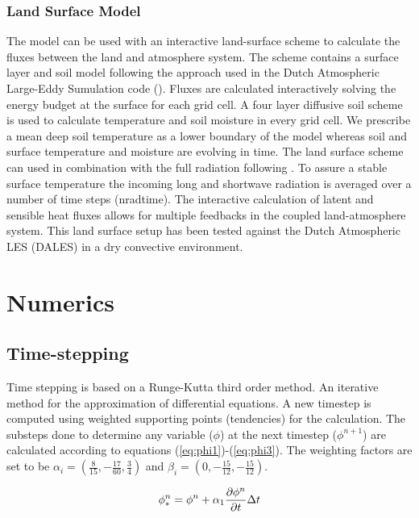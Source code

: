 \documentclass[11pt,a4paper]{article}
\begin{document}
\subsubsection{Land Surface Model}
The model can be used with an interactive land-surface scheme to calculate
the fluxes between the land and atmosphere system.
The scheme contains a surface layer and soil model following the approach
used in the Dutch Atmospheric Large-Eddy Sumulation code (\cite{Heus:2010}).
Fluxes are calculated interactively solving the energy budget at the surface for
each grid cell.
A four layer diffusive soil scheme is used to calculate temperature and soil
moisture in every grid cell.
We prescribe a mean deep soil temperature as a lower boundary of the model
whereas soil and surface temperature and moisture are evolving in time.
The land surface scheme can used in combination with the full radiation 
following \cite{Pincus:2009}.
To assure a stable surface temperature the incoming long and shortwave
radiation is averaged over a number of time steps (nradtime).
The interactive calculation of latent and sensible heat fluxes allows for multiple
feedbacks in the coupled land-atmosphere system.
This land surface setup has been tested against the Dutch Atmospheric 
LES (DALES) in a dry convective environment.

\section{Numerics}

\subsection{Time-stepping}
Time stepping is based on a Runge-Kutta third order method.
An iterative method for the approximation of differential equations.
A new timestep is computed using weighted supporting points (tendencies) for the calculation.
The substeps done to determine any variable ($\phi$) at the next timestep ($\phi^{n+1}$) are
calculated according to equations (\ref{eq:phi1})-(\ref{eq:phi3}).
The weighting factors are set to be $\alpha_i = (\frac{8}{15}, -\frac{17}{60}, \frac{3}{4})$
and $\beta_i = (0, -\frac{15}{12}, -\frac{15}{12})$. 

\begin{equation}
	\phi_*^{n} = \phi^{n} + \alpha_1 \frac{\partial \phi^{n}}{\partial t} \Delta t \\
	\label{eq:phi1}
\end{equation}
\end{document}

